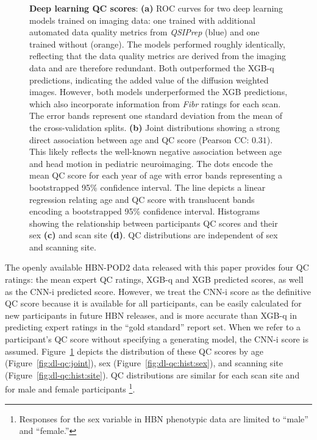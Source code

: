 \documentclass[fleqn,10pt,inline]{wlscirep}
\begin{document}
\begin{figure}[!t]
\begin{subfigure}{\linewidth}
    \end{subfigure}
    \caption{%
        {\bf Deep learning QC scores}:
        \textbf{(a)} ROC curves for two deep learning models trained on imaging data: one trained with
        additional automated data quality metrics from \emph{QSIPrep} (blue) and one
        trained without (orange). The models performed roughly identically,
        reflecting that the data quality metrics are derived from the imaging data and are therefore redundant. Both outperformed the XGB-q predictions, indicating the
        added value of the diffusion weighted images. However, both models
        underperformed the XGB predictions, which also incorporate
        information from \emph{Fibr} ratings for each scan. The error bands
        represent one standard deviation from the mean of the cross-validation
        splits.
        \textbf{(b)} Joint distributions showing a strong direct association
        between age and QC score (Pearson CC: $0.31$). This likely reflects the well-known negative
        association between age and head motion in pediatric neuroimaging.
        The dots encode the mean QC score for each year of age with error bands
        representing a bootstrapped 95\% confidence interval. The line depicts
        a linear regression relating age and QC score with translucent bands
        encoding a bootstrapped 95\% confidence interval.
        Histograms showing the relationship between participants QC scores and
        their sex \textbf{(c)} and scan site \textbf{(d)}. QC distributions are independent
        of sex and scanning site.
    }
    \label{fig:dl-qc}
\end{figure}

The openly available HBN-POD2 data released with this paper provides four QC ratings: the mean expert QC ratings, XGB-q and
XGB predicted scores, as well as the CNN-i predicted score. However, we treat the CNN-i
score as the definitive QC score because it is available for all participants,
can be easily calculated for new participants in future HBN releases, and is more
accurate than XGB-q in predicting expert ratings in the ``gold standard'' report set. When we refer to a participant's QC score without
specifying a generating model, the CNN-i score is assumed.
Figure~\ref{fig:dl-qc} depicts the distribution of these QC scores by age
(Figure~\ref{fig:dl-qc:joint}), sex (Figure~\ref{fig:dl-qc:hist:sex}), and scanning site
(Figure~\ref{fig:dl-qc:hist:site}). QC distributions are similar for each scan site
and for male and female participants \footnote{%
    Responses for the sex variable in HBN phenotypic data are limited to
    ``male'' and ``female.''
}.
\end{document}
